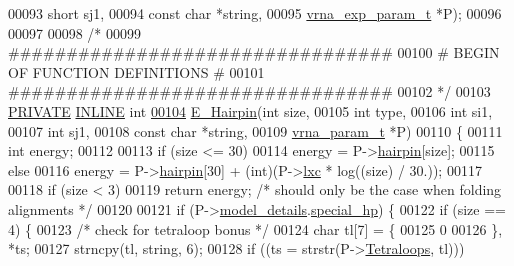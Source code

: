 \begin{DoxyCode}
00093               \textcolor{keywordtype}{short}             sj1,
00094               \textcolor{keyword}{const} \textcolor{keywordtype}{char}        *\textcolor{keywordtype}{string},
00095               \mbox{\hyperlink{group__energy__parameters_structvrna__exp__param__s}{vrna\_exp\_param\_t}}  *P);
00096 
00097 
00098 \textcolor{comment}{/*}
00099 \textcolor{comment}{ #################################}
00100 \textcolor{comment}{ # BEGIN OF FUNCTION DEFINITIONS #}
00101 \textcolor{comment}{ #################################}
00102 \textcolor{comment}{ */}
00103 \mbox{\hyperlink{edit__cost_8h_a5e151c615eda34903514212f05a5ccf8}{PRIVATE}} \mbox{\hyperlink{hairpin__loops_8h_a2eb6f9e0395b47b8d5e3eeae4fe0c116}{INLINE}} \textcolor{keywordtype}{int}
\mbox{\hyperlink{group__loops_gadf943ee9a45b7f4cee9192c06210dace}{00104}} \mbox{\hyperlink{group__loops_gadf943ee9a45b7f4cee9192c06210dace}{E\_Hairpin}}(\textcolor{keywordtype}{int}           size,
00105           \textcolor{keywordtype}{int}           type,
00106           \textcolor{keywordtype}{int}           si1,
00107           \textcolor{keywordtype}{int}           sj1,
00108           \textcolor{keyword}{const} \textcolor{keywordtype}{char}    *\textcolor{keywordtype}{string},
00109           \mbox{\hyperlink{group__energy__parameters_structvrna__param__s}{vrna\_param\_t}}  *P)
00110 \{
00111   \textcolor{keywordtype}{int} energy;
00112 
00113   \textcolor{keywordflow}{if} (size <= 30)
00114     energy = P->\mbox{\hyperlink{group__energy__parameters_ac3160bdbb97b2ef9e949c9ba66bf057c}{hairpin}}[size];
00115   \textcolor{keywordflow}{else}
00116     energy = P->\mbox{\hyperlink{group__energy__parameters_ac3160bdbb97b2ef9e949c9ba66bf057c}{hairpin}}[30] + (int)(P->\mbox{\hyperlink{group__energy__parameters_a24ea058414d3fb918c7fbf189a4a1e51}{lxc}} * log((size) / 30.));
00117 
00118   \textcolor{keywordflow}{if} (size < 3)
00119     \textcolor{keywordflow}{return} energy;            \textcolor{comment}{/* should only be the case when folding alignments */}
00120 
00121   \textcolor{keywordflow}{if} (P->\mbox{\hyperlink{group__energy__parameters_a7b84353eb9075c595bad4ceb871bcae7}{model\_details}}.\mbox{\hyperlink{group__model__details_add64a96d23e77ef1d0ddf8dfc5228143}{special\_hp}}) \{
00122     \textcolor{keywordflow}{if} (size == 4) \{
00123       \textcolor{comment}{/* check for tetraloop bonus */}
00124       \textcolor{keywordtype}{char} tl[7] = \{
00125         0
00126       \}, *ts;
00127       strncpy(tl, \textcolor{keywordtype}{string}, 6);
00128       \textcolor{keywordflow}{if} ((ts = strstr(P->\mbox{\hyperlink{group__energy__parameters_a2fda2f47699f66eb79becc63481dc7a5}{Tetraloops}}, tl)))

\end{DoxyCode}

